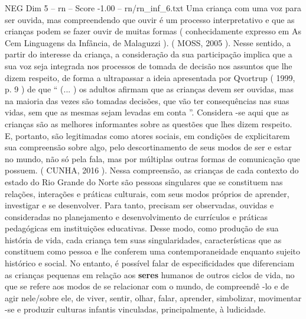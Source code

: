 \begin{textsample}{NEG Dim 5 – rn – Score -1.00 – rn/rn\_inf\_6.txt}
Uma criança com uma voz para ser ouvida, mas compreendendo que ouvir é um processo interpretativo e que as crianças podem se fazer ouvir de muitas formas ( conhecidamente expresso em As Cem Linguagens da Infância, de Malaguzzi ). ( MOSS, 2005 ).
Nesse sentido, a partir do interesse da criança, a consideração da sua participação implica que a sua voz seja integrada nos processos de tomada de decisão nos assuntos que lhe dizem respeito, de forma a ultrapassar a ideia apresentada por Qvortrup ( 1999, p. 9 ) de que “ (... ) os adultos afirmam que as crianças devem ser ouvidas, mas na maioria das vezes são tomadas decisões, que vão ter consequências nas suas vidas, sem que as mesmas sejam levadas em conta ”.
Considera -se aqui que as crianças são as melhores informantes sobre as questões que lhes dizem respeito.
E, portanto, são legitimadas como atores sociais, em condições de explicitarem sua compreensão sobre algo, pelo descortinamento de seus modos de ser e estar no mundo, não só pela fala, mas por múltiplas outras formas de comunicação que possuem. ( CUNHA, 2016 ).
Nessa compreensão, as crianças de cada contexto do estado do Rio Grande do Norte são pessoas singulares que se constituem nas relações, interações e práticas culturais, com seus modos próprios de aprender, investigar e se desenvolver.
Para tanto, precisam ser observadas, ouvidas e consideradas no planejamento e desenvolvimento de currículos e práticas pedagógicas em instituições educativas.
Desse modo, como produção de sua história de vida, cada criança tem suas singularidades, características que as constituem como pessoa e lhe conferem uma contemporaneidade enquanto sujeito histórico e social.
No entanto, é possível falar de especificidades que diferenciam as crianças pequenas em relação aos \textbf{seres} humanos de outros ciclos de vida, no que se refere aos modos de se relacionar com o mundo, de compreendê -lo e de agir nele/sobre ele, de viver, sentir, olhar, falar, aprender, simbolizar, movimentar -se e produzir culturas infantis vinculadas, principalmente, à ludicidade.

\end{textsample}

